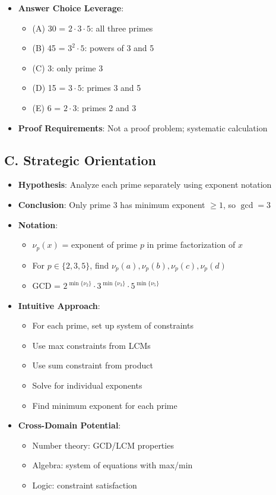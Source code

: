 \documentclass[12pt]{article}
\begin{document}
\begin{problemconfigbox}
\begin{itemize}[leftmargin=*]
    \item \textbf{Answer Choice Leverage}: 
    \begin{itemize}
        \item (A) 30 = $2 \cdot 3 \cdot 5$: all three primes
        \item (B) 45 = $3^2 \cdot 5$: powers of 3 and 5
        \item (C) 3: only prime 3
        \item (D) 15 = $3 \cdot 5$: primes 3 and 5
        \item (E) 6 = $2 \cdot 3$: primes 2 and 3
    \end{itemize}
    \item \textbf{Proof Requirements}: Not a proof problem; systematic calculation
\end{itemize}

\subsection*{C. Strategic Orientation}
\begin{itemize}[leftmargin=*]
    \item \textbf{Hypothesis}: Analyze each prime separately using exponent notation
    \item \textbf{Conclusion}: Only prime 3 has minimum exponent $\geq 1$, so $\gcd = 3$
    \item \textbf{Notation}: 
    \begin{itemize}
        \item $\nu_p(x)$ = exponent of prime $p$ in prime factorization of $x$
        \item For $p \in \{2, 3, 5\}$, find $\nu_p(a), \nu_p(b), \nu_p(c), \nu_p(d)$
        \item GCD = $2^{\min\{\nu_2\}} \cdot 3^{\min\{\nu_3\}} \cdot 5^{\min\{\nu_5\}}$
    \end{itemize}
    \item \textbf{Intuitive Approach}: 
    \begin{itemize}
        \item For each prime, set up system of constraints
        \item Use max constraints from LCMs
        \item Use sum constraint from product
        \item Solve for individual exponents
        \item Find minimum exponent for each prime
    \end{itemize}
    \item \textbf{Cross-Domain Potential}: 
    \begin{itemize}
        \item Number theory: GCD/LCM properties
        \item Algebra: system of equations with max/min
        \item Logic: constraint satisfaction
    \end{itemize}
\end{itemize}
\end{problemconfigbox}
\end{document}
